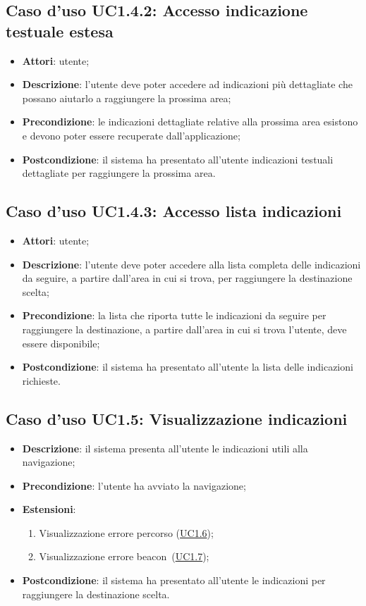 \documentclass[../AnalisiDeiRequisiti.tex]{subfiles}
\begin{document}
\subsection{Caso d'uso UC1.4.2: Accesso indicazione testuale estesa}
\begin{itemize}
\item \textbf{Attori}: utente;
\item \textbf{Descrizione}: l'utente deve poter accedere ad indicazioni più dettagliate che possano aiutarlo a raggiungere la prossima area; 
      \item \textbf{Precondizione}: le indicazioni dettagliate relative alla prossima area esistono e devono poter essere recuperate dall'applicazione;
    \item \textbf{Postcondizione}: il sistema ha presentato all'utente indicazioni testuali dettagliate per raggiungere la prossima area.
  \end{itemize}
\hypertarget{UC1.4.3}{}
\subsection{Caso d'uso UC1.4.3: Accesso lista indicazioni}
\begin{itemize}
\item \textbf{Attori}: utente;
\item \textbf{Descrizione}: l'utente deve poter accedere alla lista completa delle indicazioni da seguire, a partire dall'area in cui si trova, per raggiungere la destinazione scelta; 
      \item \textbf{Precondizione}: la lista che riporta tutte le indicazioni da seguire per raggiungere la destinazione, a partire dall'area in cui si trova l'utente, deve essere disponibile;
    \item \textbf{Postcondizione}: il sistema ha presentato all'utente la lista delle indicazioni richieste.
  \end{itemize}
\hypertarget{UC1.5}{}
\subsection{Caso d'uso UC1.5: Visualizzazione indicazioni}
\begin{itemize}

\item \textbf{Descrizione}: il sistema presenta all'utente le indicazioni utili alla navigazione; 
      \item \textbf{Precondizione}: l'utente ha avviato la navigazione;
    \item \textbf{Estensioni}:
      \begin{enumerate}
          \item Visualizzazione errore percorso (\hyperlink{UC1.6}{UC1.6});
          \item Visualizzazione errore beacon\g\ (\hyperlink{UC1.7}{UC1.7});

      \end{enumerate}
    \item \textbf{Postcondizione}: il sistema ha presentato all'utente le indicazioni per raggiungere la destinazione scelta.
  \end{itemize}
\hypertarget{UC1.6}{}
\end{document}
